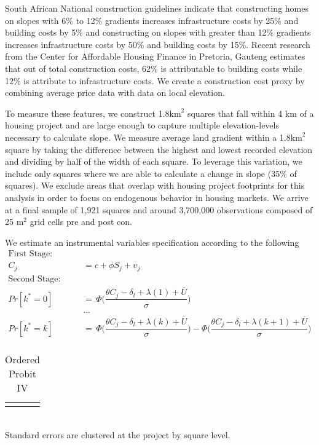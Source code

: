 \documentclass[12pt]{article}
\begin{document}
South African National construction guidelines indicate that constructing homes on slopes with 6\% to 12\% gradients increases infrastructure costs by 25\% and building costs by 5\% and constructing on slopes with greater than 12\% gradients increases infrastructure costs by 50\% and building costs by 15\%.  Recent research from the Center for Affordable Housing Finance in Pretoria, Gauteng estimates that out of total construction costs, 62\% is attributable to building costs while 12\% is attribute to infrastructure costs.  We create a construction cost proxy by combining average price data with data on local elevation.

To measure these features, we construct 1.8$\text{km}^{2}$ squares that fall within 4 km of a housing project and are large enough to capture multiple elevation-levels necessary to calculate slope.  We measure average land gradient within a 1.8$\text{km}^{2}$ square by taking the difference between the highest and lowest recorded elevation and dividing by half of the width of each square.  To leverage this variation, we include only squares where we are able to calculate a change in slope (35\% of squares).  We exclude areas that overlap with housing project footprints for this analysis in order to focus on endogenous behavior in housing markets.  We arrive at a final sample of 1,921 squares and around 3,700,000 observations composed of 25 $\text{m}^2$ grid cells pre and post con.

We estimate an instrumental variables specification according to the following 
\begin{align*}
\text{First Stage: Linear Regression} & \\
C_{j} &= c + \phi S_j + \upsilon_j \\ 
\text{Second Stage: Ordered Probit} & \\
Pr[ k^{*} =0 ] \, &= \, \Phi\Bigg(\dfrac{\theta C_{j} - \delta_{l} + \lambda(1) + \overline{U}}{\sigma}\Bigg) \\
&... \\
Pr[ k^{*} =k ] \, &= \, \Phi\Bigg(\dfrac{\theta C_{j} - \delta_{l} + \lambda(k) + \overline{U}}{\sigma}\Bigg) - \Phi\Bigg(\dfrac{\theta C_{j} - \delta_{l} + \lambda(k+1) + \overline{U}}{\sigma}\Bigg) \\
\end{align*}



\begin{table}[h]
\centering
\caption{Ordered Probit IV}\label{table:ivreg_output}
\vspace{-2mm}
\begin{tabular}{lD}
\toprule



% 
% 
\bottomrule\\[-.6em]
\end{tabular}\\
Standard errors are clustered at the project by square level.  
\end{table}
\end{document}
